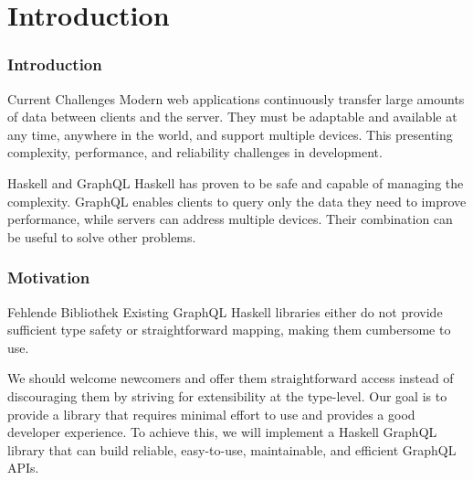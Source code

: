 \section{Introduction}

\begin{frame}\frametitle{Introduction}

    \begin{alertblock}{Current Challenges}
        Modern web applications continuously transfer large amounts of data between clients and the server. They must be adaptable and available at any time, anywhere in the world, and support multiple devices. This presenting complexity, performance, and reliability challenges in development. 
    \end{alertblock}

    \begin{alertblock}{Haskell and  GraphQL}
        Haskell has proven to be safe and capable of managing the complexity. GraphQL enables clients to query only the data they need to improve performance, while servers can address multiple devices. Their combination can be useful to solve other problems.
    \end{alertblock}

\end{frame}

\begin{frame}\frametitle{Motivation}

\begin{block}{Fehlende Bibliothek}
        Existing GraphQL Haskell libraries either do not provide sufficient type safety or straightforward mapping, making them cumbersome to use.
\end{block}

We should welcome newcomers and offer them straightforward access instead of discouraging them by striving for extensibility at the type-level.  Our goal is to provide a library that requires minimal effort to use and provides a good developer experience. To achieve this, we will implement a Haskell GraphQL library that can build reliable, easy-to-use, maintainable, and efficient GraphQL APIs.

\end{frame}